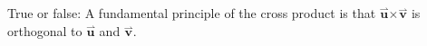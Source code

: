 \documentclass{ximera}
\author{Gregory Hartman \and Matthew Carr}
\begin{document}
\begin{exercise}
True or false: A fundamental principle of the cross product is that $\overset{\boldsymbol{\rightharpoonup}}{\mathbf{u}} \boldsymbol\times \overset{\boldsymbol{\rightharpoonup}}{\mathbf{v}}$ is orthogonal to $\overset{\boldsymbol{\rightharpoonup}}{\mathbf{u}}$ and $\overset{\boldsymbol{\rightharpoonup}}{\mathbf{v}}$.
\begin{multipleChoice}
\end{multipleChoice}

\end{exercise}
\end{document}

